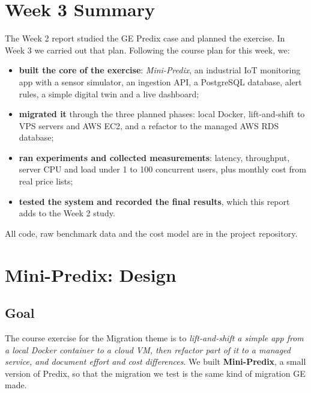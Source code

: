 \documentclass[12pt,a4paper]{article}
\begin{document}
\section{Week 3 Summary}
The Week 2 report studied the GE Predix case and planned the exercise. In Week 3 we carried out that
plan. Following the course plan for this week, we:
\begin{itemize}
  \item \textbf{built the core of the exercise}: \emph{Mini-Predix}, an industrial IoT monitoring app
        with a sensor simulator, an ingestion API, a PostgreSQL database, alert rules, a simple digital
        twin and a live dashboard;
  \item \textbf{migrated it} through the three planned phases: local Docker, lift-and-shift to VPS
        servers and AWS EC2, and a refactor to the managed AWS RDS database;
  \item \textbf{ran experiments and collected measurements}: latency, throughput, server CPU and load
        under 1 to 100 concurrent users, plus monthly cost from real price lists;
  \item \textbf{tested the system and recorded the final results}, which this report adds to the
        Week 2 study.
\end{itemize}
All code, raw benchmark data and the cost model are in the project repository.

\section{Mini-Predix: Design}
\subsection{Goal}
The course exercise for the Migration theme is to \emph{lift-and-shift a simple app from a local Docker
container to a cloud VM, then refactor part of it to a managed service, and document effort and cost
differences}. We built \textbf{Mini-Predix}, a small version of Predix, so that the migration we test is
the same kind of migration GE made.
\end{document}
